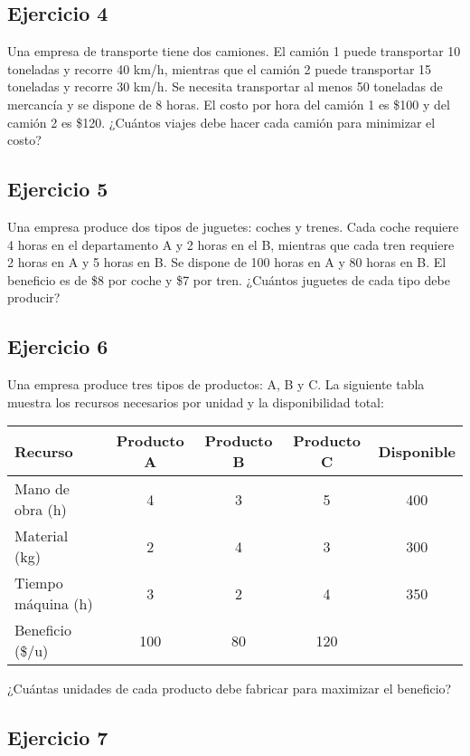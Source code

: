 \documentclass[12pt]{article}
\begin{document}
\subsection{Ejercicio 4}

Una empresa de transporte tiene dos camiones. El camión 1 puede transportar 10 toneladas y recorre 40 km/h, mientras que el camión 2 puede transportar 15 toneladas y recorre 30 km/h. Se necesita transportar al menos 50 toneladas de mercancía y se dispone de 8 horas. El costo por hora del camión 1 es \$100 y del camión 2 es \$120. ¿Cuántos viajes debe hacer cada camión para minimizar el costo?

\subsection{Ejercicio 5}

Una empresa produce dos tipos de juguetes: coches y trenes. Cada coche requiere 4 horas en el departamento A y 2 horas en el B, mientras que cada tren requiere 2 horas en A y 5 horas en B. Se dispone de 100 horas en A y 80 horas en B. El beneficio es de \$8 por coche y \$7 por tren. ¿Cuántos juguetes de cada tipo debe producir?

\subsection{Ejercicio 6}

Una empresa produce tres tipos de productos: A, B y C. La siguiente tabla muestra los recursos necesarios por unidad y la disponibilidad total:

\begin{center}
\begin{tabular}{lcccc}
\toprule
Recurso & Producto A & Producto B & Producto C & Disponible \\
\midrule
Mano de obra (h) & 4 & 3 & 5 & 400 \\
Material (kg) & 2 & 4 & 3 & 300 \\
Tiempo máquina (h) & 3 & 2 & 4 & 350 \\
\midrule
Beneficio (\$/u) & 100 & 80 & 120 & \\
\bottomrule
\end{tabular}
\end{center}

¿Cuántas unidades de cada producto debe fabricar para maximizar el beneficio?

\subsection{Ejercicio 7}
\end{document}
